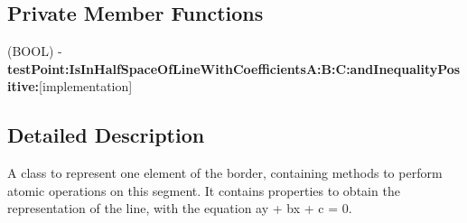 \subsection*{\-Private \-Member \-Functions}
\begin{DoxyCompactItemize}
\item 
\hypertarget{class_a_t_c_zone_border_segment_aaa1b7abf6c02608bc4b62fdff9b62a96}{
(\-B\-O\-O\-L) -\/ {\bfseries test\-Point\-:\-Is\-In\-Half\-Space\-Of\-Line\-With\-Coefficients\-A\-:\-B\-:\-C\-:and\-Inequality\-Positive\-:}{\ttfamily  \mbox{[}implementation\mbox{]}}}
\label{class_a_t_c_zone_border_segment_aaa1b7abf6c02608bc4b62fdff9b62a96}

\end{DoxyCompactItemize}


\subsection{\-Detailed \-Description}
\-A class to represent one element of the border, containing methods to perform atomic operations on this segment. \-It contains properties to obtain the representation of the line, with the equation ay + bx + c = 0. 

